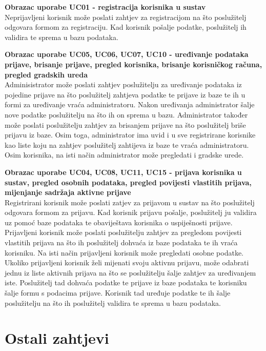 				
				\textbf{Obrazac uporabe UC01 - registracija korisnika u sustav}\\
				Neprijavljeni korisnik može poslati zahtjev za registracijom na što poslužitelj odgovara formom za registraciju. Kad korisnik pošalje podatke, poslužitelj ih validira te sprema u bazu podataka.

				\textbf{Obrazac uporabe UC05, UC06, UC07, UC10 - uređivanje podataka prijave, brisanje prijave, pregled korisnika, brisanje korisničkog računa, pregled gradskih ureda}\\
				Adminisistrator može poslati zahtjev poslužitelju za uređivanje podataka iz pojedine prijave na što poslužitelj zahtjeva podatke te prijave iz baze te ih u formi za uređivanje vraća administratoru. Nakon uređivanja administrator šalje nove podatke poslužitelju na što ih on sprema u bazu.
				Administrator također može poslati poslužitelju zahtjev za brisanjem prijave na što poslužitelj briše prijavu iz baze.
				Osim toga, administrator ima uvid i u sve registrirane korisnike kao liste koju na zahtjev poslužitelj zahtijeva iz baze te vraća administratoru.
				Osim korisnika, na isti način administrator može pregledati i gradske urede.

				\textbf{Obrazac uporabe UC04, UC08, UC11, UC15 - prijava korisnika u sustav, pregled osobnih podataka, pregled povijesti vlastitih prijava, mijenjanje sadržaja aktivne prijave}\\
				Registrirani korisnik može poslati zatjev za prijavom u sustav na što poslužitelj odgovara formom za prijavu. Kad korisnik prijavu pošalje, poslužitelj ju validira uz pomoć baze podataka te obaviještava korisnika o uspiješnosti prijave. Prijavljeni korisnik može poslati poslužitelju zahtjev za pregledom povijesti vlastitih prijava na što ih poslužitelj dohvaća iz baze podataka te ih vraća korisniku. Na isti način prijavljeni korisnik može pregledati osobne podatke.
				Ukoliko prijavljeni korisnik želi mijenati svoju aktivnu prijavu, može odabrati jednu iz liste aktivnih prijava na što se poslužitelju šalje zahtjev za uređivanjem iste. Poslužitelj tad dohvaća podatke te prijave iz baze podataka te korisniku šalje formu s podacima prijave. Korisnik tad uređuje podatke te ih šalje poslužitelju na što ih poslužitelj validira te sprema u bazu podataka.

				\eject
	
		\section{Ostali zahtjevi}
		
